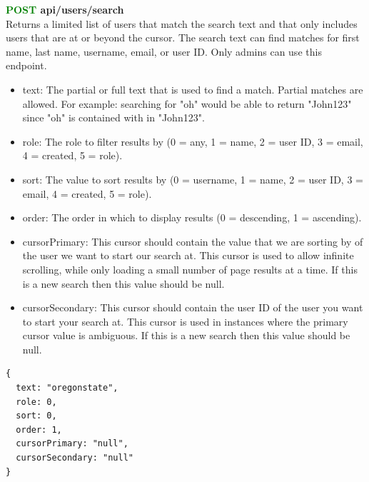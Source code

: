 \documentclass[onecolumn, draftclsnofoot,10pt, compsoc, usenames, dvipsnames]{IEEEtran}
\begin{document}
\noindent
\textbf{\textcolor{Green}{POST} api/users/search} \\
Returns a limited list of users that match the search text and that only includes users that are at or beyond the cursor. The search text can find matches for first name, last name, username, email, or user ID. Only admins can use this endpoint.
\begin{itemize}
    \item text: The partial or full text that is used to find a match. Partial matches are allowed. For example: searching for "oh" would be able to return "John123" since "oh" is contained with in "John123".
    \item role: The role to filter results by (0 = any, 1 = name, 2 = user ID, 3 = email, 4 = created, 5 = role).
    \item sort: The value to sort results by (0 = username, 1 = name, 2 = user ID, 3 = email, 4 = created, 5 = role).
    \item order: The order in which to display results (0 = descending, 1 = ascending).
    \item cursorPrimary: This cursor should contain the value that we are sorting by of the user we want to start our search at. This cursor is used to allow infinite scrolling, while only loading a small number of page results at a time. If this is a new search then this value should be null.
    \item cursorSecondary: This cursor should contain the user ID of the user you want to start your search at. This cursor is used in instances where the primary cursor value is ambiguous. If this is a new search then this value should be null.
\end{itemize}
\begin{lstlisting}[caption=Example Request Body]
{
  text: "oregonstate",
  role: 0,
  sort: 0,
  order: 1,
  cursorPrimary: "null",
  cursorSecondary: "null"
}
\end{lstlisting}
\end{document}
